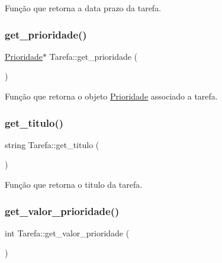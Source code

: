 Função que retorna a data prazo da tarefa. 

\mbox{\label{classTarefa_a340f64a1d2344a8088a8e4a85ba03569}} 
\subsubsection{\texorpdfstring{get\+\_\+prioridade()}{get\_prioridade()}}
{\footnotesize\ttfamily \hyperlink{classPrioridade}{Prioridade}$\ast$ Tarefa\+::get\+\_\+prioridade (\begin{DoxyParamCaption}{ }\end{DoxyParamCaption})}



Função que retorna o objeto \hyperlink{classPrioridade}{Prioridade} associado a tarefa. 

\mbox{\label{classTarefa_a76abc4ef4d7c2cd5ab2e9530700f69aa}} 
\subsubsection{\texorpdfstring{get\+\_\+titulo()}{get\_titulo()}}
{\footnotesize\ttfamily string Tarefa\+::get\+\_\+titulo (\begin{DoxyParamCaption}{ }\end{DoxyParamCaption})}



Função que retorna o titulo da tarefa. 

\mbox{\label{classTarefa_a5aaca625bccf6f153ec783fe43790cc7}} 
\subsubsection{\texorpdfstring{get\+\_\+valor\+\_\+prioridade()}{get\_valor\_prioridade()}}
{\footnotesize\ttfamily int Tarefa\+::get\+\_\+valor\+\_\+prioridade (\begin{DoxyParamCaption}{ }\end{DoxyParamCaption})}



